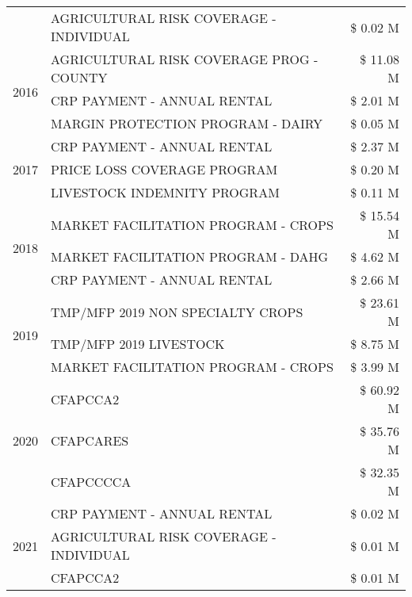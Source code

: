 \begin{tabular}{llr}
 & AGRICULTURAL RISK COVERAGE - INDIVIDUAL & \$ 0.02 M \\
\cline{1-3}
\multirow[t]{3}{*}{2016} & AGRICULTURAL RISK COVERAGE PROG - COUNTY & \$ 11.08 M \\
 & CRP PAYMENT - ANNUAL RENTAL & \$ 2.01 M \\
 & MARGIN PROTECTION PROGRAM - DAIRY & \$ 0.05 M \\
\cline{1-3}
\multirow[t]{3}{*}{2017} & CRP PAYMENT - ANNUAL RENTAL & \$ 2.37 M \\
 & PRICE LOSS COVERAGE PROGRAM & \$ 0.20 M \\
 & LIVESTOCK INDEMNITY PROGRAM & \$ 0.11 M \\
\cline{1-3}
\multirow[t]{3}{*}{2018} & MARKET FACILITATION PROGRAM - CROPS & \$ 15.54 M \\
 & MARKET FACILITATION PROGRAM - DAHG & \$ 4.62 M \\
 & CRP PAYMENT - ANNUAL RENTAL & \$ 2.66 M \\
\cline{1-3}
\multirow[t]{3}{*}{2019} & TMP/MFP 2019 NON SPECIALTY CROPS & \$ 23.61 M \\
 & TMP/MFP 2019 LIVESTOCK & \$ 8.75 M \\
 & MARKET FACILITATION PROGRAM - CROPS & \$ 3.99 M \\
\cline{1-3}
\multirow[t]{3}{*}{2020} & CFAPCCA2 & \$ 60.92 M \\
 & CFAPCARES & \$ 35.76 M \\
 & CFAPCCCCA & \$ 32.35 M \\
\cline{1-3}
\multirow[t]{3}{*}{2021} & CRP PAYMENT - ANNUAL RENTAL & \$ 0.02 M \\
 & AGRICULTURAL RISK COVERAGE - INDIVIDUAL & \$ 0.01 M \\
 & CFAPCCA2 & \$ 0.01 M \\
\cline{1-3}
\bottomrule
\end{tabular}
